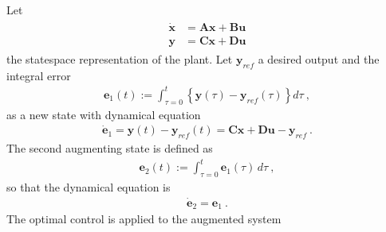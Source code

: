 \documentclass[letterpaper,10pt,english]{jupyterBook}
\begin{document}
\sphinxAtStartPar
Let
\begin{equation*}
\begin{split}\begin{aligned}
 \dot{\mathbf{x}} & = \mathbf{A} \mathbf{x} + \mathbf{B} \mathbf{u} \\
      \mathbf{y}  & = \mathbf{C} \mathbf{x} + \mathbf{D} \mathbf{u}
\end{aligned}\end{split}
\end{equation*}
\sphinxAtStartPar
the state\sphinxhyphen{}space representation of the plant. Let \(\mathbf{y}_{ref}\) a desired output and the integral error
\begin{equation*}
\begin{split}\mathbf{e}_1(t) := \int_{\tau=0}^{t} \left\{ \mathbf{y}(\tau) - \mathbf{y}_{ref}(\tau) \right\} d \tau \ ,\end{split}
\end{equation*}
\sphinxAtStartPar
as a new state with dynamical equation
\begin{equation*}
\begin{split}\dot{\mathbf{e}}_1 = \mathbf{y}(t) - \mathbf{y}_{ref}(t) = \mathbf{C} \mathbf{x} + \mathbf{D} \mathbf{u} - \mathbf{y}_{ref} \ .\end{split}
\end{equation*}
\sphinxAtStartPar
The second augmenting state is defined as
\begin{equation*}
\begin{split}\mathbf{e}_2(t) := \int_{\tau=0}^{t} \mathbf{e}_1(\tau) \, d\tau \ ,\end{split}
\end{equation*}
\sphinxAtStartPar
so that the dynamical equation is
\begin{equation*}
\begin{split}\dot{\mathbf{e}}_2 = \mathbf{e}_1 \ .\end{split}
\end{equation*}
\sphinxAtStartPar
The optimal control is applied to the augmented system
\end{document}
